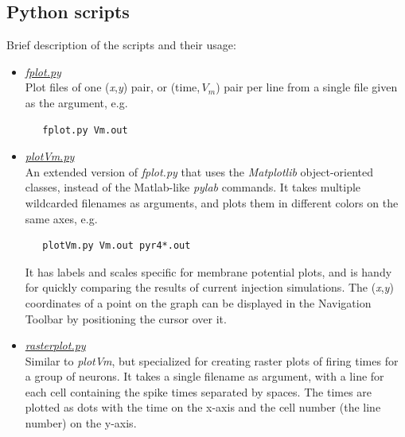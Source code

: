 \documentclass[12pt]{article}
\begin{document}
\subsection*{Python scripts}

Brief description of the scripts and their usage:

\begin{itemize}
\item \href{../g3plot-fplot/g3plot-fplot.tex}{\it fplot.py}\\
Plot files of one ({\it x},{\it y}) pair,
or (time,\,$V_m$) pair per line from a single file given as the argument, e.g.
\begin{verbatim}
   fplot.py Vm.out
\end{verbatim}

\item \href{../g3plot-plotvm/g3plot-plotvm.tex}{\it plotVm.py}\\
An extended version of {\it fplot.py} that uses the {\it Matplotlib}
object-oriented classes, instead of the Matlab-like {\it pylab} commands.  It
takes multiple wildcarded filenames as arguments, and plots them in
different colors on the same axes, e.g.
\begin{verbatim}
   plotVm.py Vm.out pyr4*.out
\end{verbatim}

It has labels and scales specific for membrane potential plots, and is
handy for quickly comparing the results of current injection simulations.
The ({\it x},{\it y}) coordinates of a point on the graph can be displayed in the
Navigation Toolbar by positioning the cursor over it.

\item \href{../g3plot-rasterplot/g3plot-rasterplot.tex}{\it rasterplot.py}\\
Similar to {\it plotVm}, but specialized for creating raster
plots of firing times for a group of neurons.  It takes a single filename
as argument, with a line for each cell containing the spike times separated
by spaces.  The times are plotted as dots with the time on the x-axis and
the cell number (the line number) on the y-axis.


\end{itemize}
\end{document}
